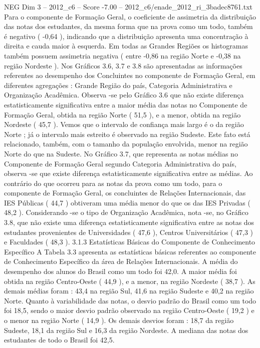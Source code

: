 \begin{textsample}{NEG Dim 3 – 2012\_c6 – Score -7.00 – 2012\_c6/enade\_2012\_ri\_3badec8761.txt}
Para o componente de Formação Geral, o coeficiente de assimetria da distribuição das notas dos estudantes, da mesma forma que na prova como um todo, também é negativo ( -0,64 ), indicando que a distribuição apresenta uma concentração à direita e cauda maior à esquerda.
Em todas as Grandes Regiões os histogramas também possuem assimetria negativa ( entre -0,86 na região Norte e -0,38 na região Nordeste ).
Nos Gráficos 3.6, 3.7 e 3.8 são apresentadas as informações referentes ao desempenho dos Concluintes no componente de Formação Geral, em diferentes agregações : Grande Região do país, Categoria Administrativa e Organização Acadêmica.
Observa -se pelo Gráfico 3.6 que não existe diferença estatisticamente significativa entre a maior média das notas no Componente de Formação Geral, obtida na região Norte ( 51,5 ), e a menor, obtida na região Nordeste ( 45,7 ).
Vemos que o intervalo de confiança mais largo é o da região Norte ; já o intervalo mais estreito é observado na região Sudeste.
Este fato está relacionado, também, com o tamanho da população envolvida, menor na região Norte do que na Sudeste.
No Gráfico 3.7, que representa as notas médias no Componente de Formação Geral segundo Categoria Administrativa do país, observa -se que existe diferença estatisticamente significativa entre as médias.
Ao contrário do que ocorreu para as notas da prova como um todo, para o componente de Formação Geral, os concluintes de Relações Internacionais, das IES Públicas ( 44,7 ) obtiveram uma média menor do que os das IES Privadas ( 48,2 ).
Considerando -se o tipo de Organização Acadêmica, nota -se, no Gráfico 3.8, que não existe uma diferença estatisticamente significativa entre as notas dos estudantes provenientes de Universidades ( 47,6 ), Centros Universitários ( 47,3 ) e Faculdades ( 48,3 ). 3.1.3 Estatísticas Básicas do Componente de Conhecimento Específico A Tabela 3.3 apresenta as estatísticas básicas referentes ao componente de Conhecimento Específico da área de Relações Internacionais.
A média do desempenho dos alunos do Brasil como um todo foi 42,0.
A maior média foi obtida na região Centro-Oeste ( 44,9 ), e a menor, na região Nordeste ( 38,7 ).
As demais médias foram : 43,4 na região Sul, 41,6 na região Sudeste e 40,2 na região Norte.
Quanto à variabilidade das notas, o desvio padrão do Brasil como um todo foi 18,5, sendo o maior desvio padrão observado na região Centro-Oeste ( 19,2 ) e o menor na região Norte ( 14,9 ).
Os demais desvios foram : 18,7 da região Sudeste, 18,1 da região Sul e 16,3 da região Nordeste.
A mediana das notas dos estudantes de todo o Brasil foi 42,5.

\end{textsample}
